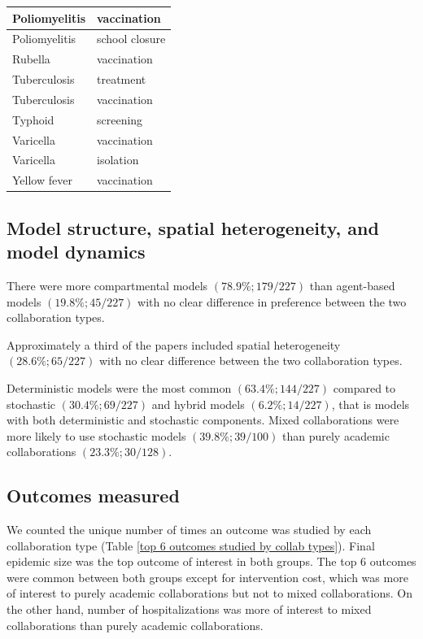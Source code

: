 \documentclass[10pt,letterpaper]{article}
\begin{document}
\begin{table}
\begin{tabular}{| l | l |}
			Poliomyelitis & vaccination \\ \hline
			Poliomyelitis & school closure \\ \hline
			Rubella & vaccination \\ \hline
			Tuberculosis & treatment \\ \hline
			Tuberculosis & vaccination \\ \hline
			Typhoid & screening \\ \hline
			Varicella & vaccination \\ \hline
			Varicella & isolation \\ \hline
			Yellow fever & vaccination \\ \hline
		\end{tabular}
			\label{top2_interventions_per_disease}
	\end{table} 


\subsection*{Model structure, spatial heterogeneity, and model dynamics}
There were more compartmental models $(78.9\%; 179/227)$ than agent-based models $(19.8\%; 45/227)$ with no clear difference in preference between the two collaboration types. 

Approximately a third of the papers included spatial heterogeneity $(28.6\%; 65/227)$ with no clear difference between the two collaboration types. 

Deterministic models were the most common $(63.4\%; 144/227)$ compared to stochastic $(30.4\%; 69/227)$ and hybrid models $(6.2\%; 14/227)$, that is models with both deterministic and stochastic components. Mixed collaborations were more likely to use stochastic models $(39.8\%; 39/100)$ than purely academic collaborations $(23.3\%; 30/128)$.

\subsection*{Outcomes measured}
We counted the unique number of times an outcome was studied by each collaboration type (Table \ref{top 6 outcomes studied by collab types}). Final epidemic size was the top outcome of interest in both groups. The top 6 outcomes were common between both groups except for intervention cost, which was more of interest to purely academic collaborations but not to mixed collaborations. On the other hand, number of hospitalizations was more of interest to mixed collaborations than purely academic collaborations. 
\end{document}
